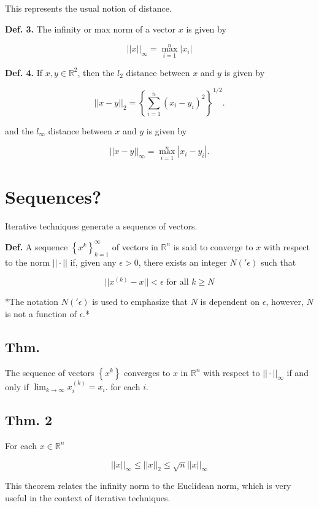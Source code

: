 \documentclass[12pt]{article}
\begin{document}
This represents the usual notion of distance.

\textbf{Def. 3.} The infinity or max norm of a vector $x$ is given by

\begin{equation*}
  ||x||_\infty = \max_{i=1}^n |x_i|
\end{equation*}

\textbf{Def. 4.} If $x,y \in \mathbb{R}^2$, then the $l_2$ distance between
$x$ and $y$ is given by

\begin{equation*}
  ||x-y||_2 = \left\{ \sum_{i=1}^{n} (x_i-y_i)^2 \right\}^{1/2}
.\end{equation*}

and the $l_\infty$ distance between $x$ and $y$ is given by

\begin{equation*}
  ||x-y||_\infty = \max_{i=1}^n |x_i-y_i|
.\end{equation*}

\section{Sequences?}

Iterative techniques generate a sequence of vectors.

\textbf{Def.} A sequence $\left\{ x^k \right\}_{k=1}^\infty$ of vectors in
$\mathbb{R}^n$ is said to converge to $x$ with respect to the norm $||\cdot||$
if, given any $\epsilon > 0$, there exists an integer $N('\epsilon)$ such that

\begin{equation*}
  ||x^{(k)} - x|| < \epsilon \text{ for all } k \geq N
\end{equation*}

*The notation $N('\epsilon)$ is used to emphasize that $N$ is dependent on 
$\epsilon$, however, $N$ is not a function of $\epsilon$.*

\subsection{Thm.}

The sequence of vectors $\left\{ x^k \right\}$ converges to $x$ in $\mathbb{R}^n $
with respect to $||\cdot||_\infty$ if and only if 
$\lim_{k \to \infty} x_i^{(k)} = x_i$. for each $i$.

\subsection{Thm. 2}

For each $x\in \mathbb{R}^n $

\begin{equation*}
  ||x||_\infty \leq ||x||_2 \leq \sqrt{n} ||x||_\infty
\end{equation*}

This theorem relates the infinity norm to the Euclidean norm, which is very 
useful in the context of iterative techniques.
\end{document}
